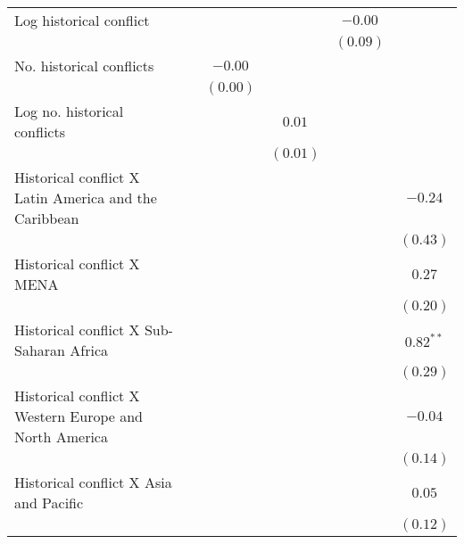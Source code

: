 \begin{table}[H]
\begin{center}
{\begin{tabular}{l c c c c c}
Log historical conflict                                &             &             &             & $-0.00$     &                \\
                                                       &             &             &             & $(0.09)$    &                \\
No. historical conflicts                               &             & $-0.00$     &             &             &                \\
                                                       &             & $(0.00)$    &             &             &                \\
Log no. historical conflicts                           &             &             & $0.01$      &             &                \\
                                                       &             &             & $(0.01)$    &             &                \\
Historical conflict X Latin America and the Caribbean  &             &             &             &             & $-0.24$        \\
                                                       &             &             &             &             & $(0.43)$       \\
Historical conflict X MENA                             &             &             &             &             & $0.27$         \\
                                                       &             &             &             &             & $(0.20)$       \\
Historical conflict X  Sub-Saharan Africa              &             &             &             &             & $0.82^{**}$    \\
                                                       &             &             &             &             & $(0.29)$       \\
Historical conflict X Western Europe and North America &             &             &             &             & $-0.04$        \\
                                                       &             &             &             &             & $(0.14)$       \\
Historical conflict X Asia and Pacific                 &             &             &             &             & $0.05$         \\
                                                       &             &             &             &             & $(0.12)$       \\

\end{tabular}}
\end{center}
\end{table}

